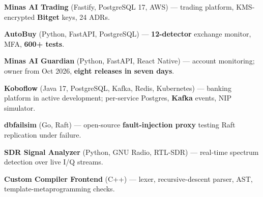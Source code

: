 \item \textbf{Minas AI Trading} (Fastify, PostgreSQL 17, AWS) --- trading platform, KMS-encrypted \textbf{Bitget} keys, 24 ADRs.
\item \textbf{AutoBuy} (Python, FastAPI, PostgreSQL) --- \textbf{12-detector} exchange monitor, MFA, \textbf{600+ tests}.
\item \textbf{Minas AI Guardian} (Python, FastAPI, React Native) --- account monitoring; owner from Oct 2026, \textbf{eight releases in seven days}.
\item \textbf{Koboflow} (Java 17, PostgreSQL, Kafka, Redis, Kubernetes) --- banking platform in active development; per-service Postgres, \textbf{Kafka} events, NIP simulator.
\item \textbf{dbfailsim} (Go, Raft) --- open-source \textbf{fault-injection proxy} testing Raft replication under failure.
\item \textbf{SDR Signal Analyzer} (Python, GNU Radio, RTL-SDR) --- real-time spectrum detection over live I/Q streams.
\item \textbf{Custom Compiler Frontend} (C++) --- lexer, recursive-descent parser, AST, template-metaprogramming checks.
